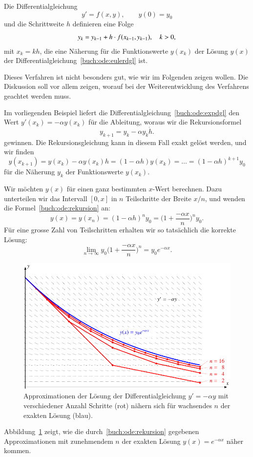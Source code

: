 \begin{satz}
%
Die Differentialgleichung
\begin{equation}
y'=f(x,y),\qquad y(0)=y_0
\label{buch:ode:eulerdgl}
\end{equation}
und die Schrittweite $h$ definieren eine Folge 
\[
y_{\mathstrut k}=y_{k-1} + h\cdot f(x_{k-1}, y_{k-1}),\quad k>0,
\]
mit $x_k=kh$,
die eine Näherung für die Funktionswerte $y(x_k)$ der Lösung $y(x)$
der Differentialgleichung~\eqref{buch:ode:eulerdgl} ist.
\end{satz}

Dieses Verfahren ist nicht besonders gut, wie wir im Folgenden zeigen
wollen.
Die Diskussion soll vor allem zeigen, worauf bei der Weiterentwicklung
des Verfahrens geachtet werden muss.

Im vorliegenden Beispiel liefert die
Differentialgleichung~\eqref{buch:ode:expdgl}
den Wert $y'(x_k)=-\alpha y(x_k)$ für die Ableitung,
woraus wir die Rekursionsformel
\[
y_{k+1}=y_k - \alpha y_k \dot h.
\]
gewinnen.
Die Rekursionsgleichung kann in diesem Fall exakt gelöst werden,
und wir finden
%
\begin{equation}
y(x_{k+1}) = y(x_k)-\alpha y(x_k) h=(1-\alpha h) y(x_k)=\dots
=(1-\alpha h)^{k+1}y_0
\label{buch:ode:rekursion}
\end{equation}
für die Näherung $y_k$ der Funktionswerte $y(x_k)$.

Wir möchten $y(x)$ für einen ganz bestimmten $x$-Wert berechnen.
Dazu unterteilen wir das Intervall $[0,x]$ in $n$ Teilschritte der
Breite $x/n$, und wenden die Formel~\eqref{buch:ode:rekursion} an:
\[
y(x)=y(x_n)=(1-\alpha h)^n y_0=\biggl(1+\frac{-\alpha x}{n}\biggr)^n y_0.
\]
Für eine grosse Zahl von Teilschritten erhalten wir so tatsächlich die
korrekte Lösung:
\[
\lim_{n\to\infty}y_0\biggl(1+\frac{-\alpha x}n\biggr)^n=y_0 e^{-\alpha x}.
\]
\begin{figure}
\centering
\includegraphics{chapters/50-ode/figures/euler.pdf}
\caption{Approximationen der Lösung der Differentialgleichung $y'=-\alpha y$
mit verschiedener Anzahl Schritte (rot) nähern sich für wachsendes
$n$ der exakten Lösung (blau).
\label{buch:ode:approximation}}
\end{figure}%
Abbildung~\ref{buch:ode:approximation} zeigt, wie die
durch~\eqref{buch:ode:rekursion} gegebenen Approximationen mit zunehmendem
$n$ der exakten Lösung $y(x)=e^{-\alpha x}$ näher kommen.

